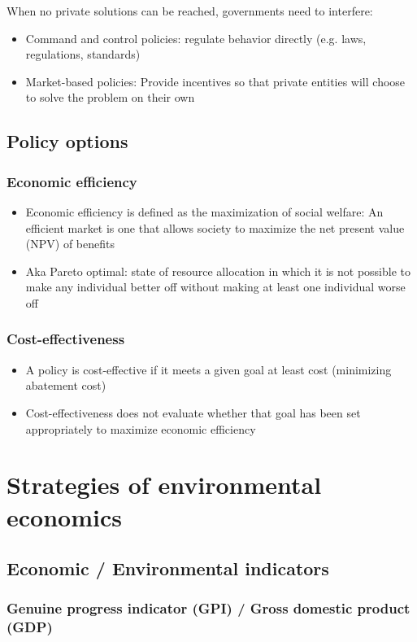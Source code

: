\documentclass{article}
\begin{document}
When no private solutions can be reached, governments need to interfere:
\begin{itemize}
    \item Command and control policies: regulate behavior directly (e.g. laws, regulations, standards)
    \item Market-based policies: Provide incentives so that private entities will choose to solve the problem on their own
\end{itemize}

\subsection{Policy options}
\subsubsection{Economic efficiency}
\begin{itemize}
    \item Economic efficiency is defined as the maximization of social welfare: An efficient market is one that allows society to maximize the net present value (NPV) of benefits
    \item Aka Pareto optimal: state of resource allocation in which it is not possible to make any individual better off without making at least one individual worse off
\end{itemize}
 
\subsubsection{Cost-effectiveness}
\begin{itemize}
    \item A policy is cost-effective if it meets a given goal at least cost (minimizing abatement cost)
    \item Cost-effectiveness does not evaluate whether that goal has been set appropriately to maximize economic efficiency
\end{itemize}

\section{Strategies of environmental economics}
\subsection{Economic / Environmental indicators}
\subsubsection{Genuine progress indicator (GPI) / Gross domestic product (GDP)}
\end{document}
